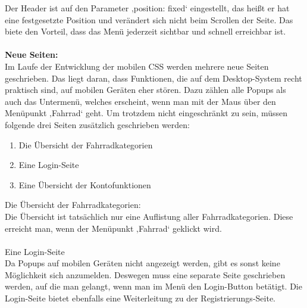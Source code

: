 Der Header ist auf den Parameter ‚position: fixed‘ eingestellt, das heißt er hat eine festgesetzte Position und verändert sich nicht beim Scrollen der Seite. Das biete den Vorteil, dass das Menü jederzeit sichtbar und schnell erreichbar ist.
\\ \\
\textbf{Neue Seiten:}
\\
Im Laufe der Entwicklung der mobilen CSS werden mehrere neue Seiten geschrieben. Das liegt daran, dass Funktionen, die auf dem Desktop-System recht praktisch sind, auf mobilen Geräten eher stören. Dazu zählen alle Popups als auch das Untermenü, welches erscheint, wenn man mit der Maus über den Menüpunkt ‚Fahrrad‘ geht. Um trotzdem nicht eingeschränkt zu sein, müssen folgende drei Seiten zusätzlich geschrieben werden:
\begin{enumerate}
\item Die Übersicht der Fahrradkategorien 
\item Eine Login-Seite
\item Eine Übersicht der Kontofunktionen
\end{enumerate}
Die Übersicht der Fahrradkategorien:
\\
Die Übersicht ist tatsächlich nur eine Auflistung aller Fahrradkategorien. Diese erreicht man, wenn der Menüpunkt ‚Fahrrad‘ geklickt wird. 
\\ \\
Eine Login-Seite
\\
Da Popups auf mobilen Geräten nicht angezeigt werden, gibt es sonst keine Möglichkeit sich anzumelden. Deswegen muss eine separate Seite geschrieben werden, auf die man gelangt, wenn man im Menü den Login-Button betätigt. Die Login-Seite bietet ebenfalls eine Weiterleitung zu der Registrierungs-Seite.

